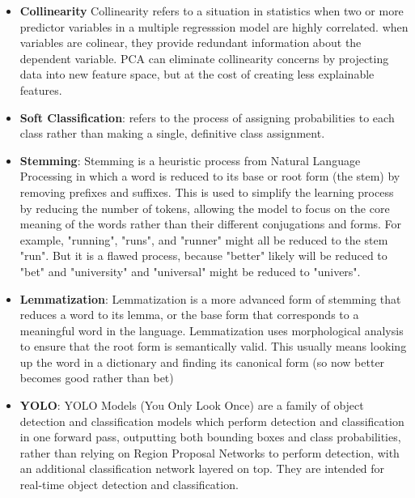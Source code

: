 \documentclass[12pt]{article}
\begin{document}
\begin{itemize}
\item \textbf{Collinearity} Collinearity refers to a situation in statistics when two or more predictor variables in a multiple regresssion model are highly correlated. when variables are colinear, they provide redundant information about the dependent variable. PCA can eliminate collinearity concerns by projecting data into new feature space, but at the cost of creating less explainable features.
\item \textbf{Soft Classification}: refers to the process of assigning probabilities to each class rather than making a single, definitive class assignment.
\item \textbf{Stemming}: Stemming is a heuristic process from Natural Language Processing in which a word is reduced to its base or root form (the stem) by removing prefixes and suffixes. This is used to simplify the learning process by reducing the number of tokens, allowing the model to focus on the core meaning of the words rather than their different conjugations and forms. For example, "running", "runs", and "runner" might all be reduced to the stem "run". But it is a flawed process, because "better" likely will be reduced to "bet" and "university" and "universal" might be reduced to "univers".
\item \textbf{Lemmatization}: Lemmatization is a more advanced form of stemming that reduces a word to its lemma, or the base form that corresponds to a meaningful word in the language. Lemmatization uses morphological analysis to ensure that the root form is semantically valid. This usually means looking up the word in a dictionary and finding its canonical form (so now better becomes good rather than bet)

\item \textbf{YOLO}: YOLO Models (You Only Look Once) are a family of object detection and classification models which perform detection and classification in one forward pass, outputting both bounding boxes and class probabilities, rather than relying on Region Proposal Networks to perform detection, with an additional classification network layered on top. They are intended for real-time object detection and classification. 


\end{itemize}
\end{document}
